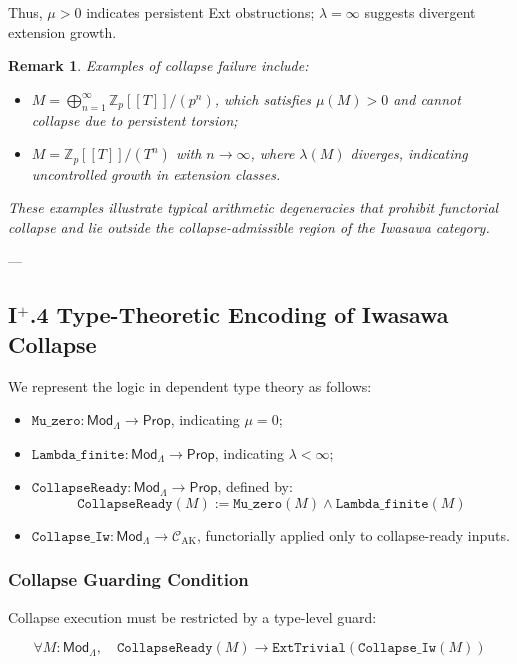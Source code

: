 \documentclass[11pt]{article}
\newtheorem{remark}[theorem]{Remark}
\begin{document}
Thus, $\mu > 0$ indicates persistent Ext obstructions; $\lambda = \infty$ suggests divergent extension growth.

\begin{remark}
Examples of collapse failure include:
\begin{itemize}
  \item $M = \bigoplus_{n=1}^\infty \mathbb{Z}_p[[T]]/(p^n)$, which satisfies $\mu(M) > 0$ and cannot collapse due to persistent torsion;
  \item $M = \mathbb{Z}_p[[T]]/(T^n)$ with $n \to \infty$, where $\lambda(M)$ diverges, indicating uncontrolled growth in extension classes.
\end{itemize}
These examples illustrate typical arithmetic degeneracies that prohibit functorial collapse and lie outside the collapse-admissible region of the Iwasawa category.
\end{remark}

---

\subsection*{I$^{+}$.4 Type-Theoretic Encoding of Iwasawa Collapse}

We represent the logic in dependent type theory as follows:

\begin{itemize}
    \item $\texttt{Mu\_zero} : \mathsf{Mod}_\Lambda \to \mathsf{Prop}$, indicating $\mu = 0$;
    \item $\texttt{Lambda\_finite} : \mathsf{Mod}_\Lambda \to \mathsf{Prop}$, indicating $\lambda < \infty$;
    \item $\texttt{CollapseReady} : \mathsf{Mod}_\Lambda \to \mathsf{Prop}$, defined by:
\[
\texttt{CollapseReady}(M) := \texttt{Mu\_zero}(M) \land \texttt{Lambda\_finite}(M)
\]
    \item $\texttt{Collapse\_Iw} : \mathsf{Mod}_\Lambda \to \mathcal{C}_{\mathrm{AK}}$, functorially applied only to collapse-ready inputs.
\end{itemize}

\subsubsection*{Collapse Guarding Condition}
Collapse execution must be restricted by a type-level guard:

\[
\forall M : \mathsf{Mod}_\Lambda, \quad \texttt{CollapseReady}(M) \to \texttt{ExtTrivial}(\texttt{Collapse\_Iw}(M))
\]
\end{document}
